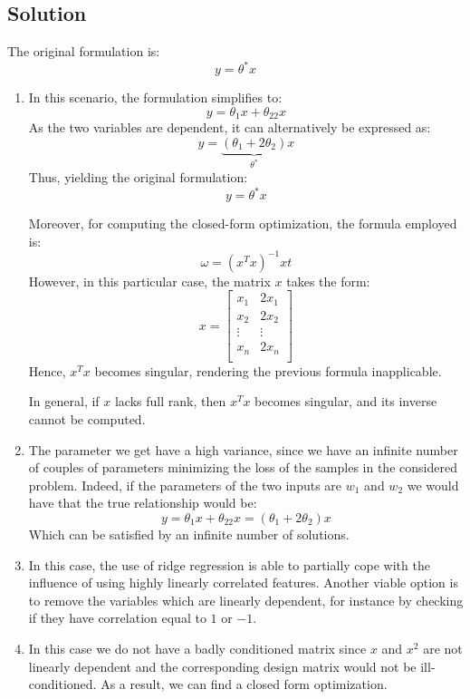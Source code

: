 \subsection{Solution}
The original formulation is: 
\[y=\theta^\ast x\]
\begin{enumerate}
    \item In this scenario, the formulation simplifies to:
        \[y=\theta_1x+\theta_22x\]
        As the two variables are dependent, it can alternatively be expressed as:
        \[y=\underbrace{\left(\theta_1+2\theta_2\right)}_{\theta^\ast} x\]
        Thus, yielding the original formulation:
        \[y=\theta^\ast x\]

        Moreover, for computing the closed-form optimization, the formula employed is:
        \[\omega=\left(x^Tx\right)^{-1}xt\]
        However, in this particular case, the matrix $x$ takes the form:
        \[x=\begin{bmatrix}
            x_1 & 2x_1 \\
            x_2 & 2x_2 \\
            \vdots & \vdots \\
            x_n & 2x_n \\
        \end{bmatrix}\]
        Hence, $x^Tx$ becomes singular, rendering the previous formula inapplicable.

        In general, if $x$ lacks full rank, then $x^Tx$ becomes singular, and its inverse cannot be computed.
    \item The parameter we get have a high variance, since we have an infinite number of couples of parameters minimizing the loss of the samples in the considered problem. 
        Indeed, if the parameters of the two inputs are $w_1$ and $w_2$ we would have that the true relationship would be:
        \[y=\theta_1x+\theta_22x=\left(\theta_1+2\theta_2\right)x\]
        Which can be satisfied by an infinite number of solutions.
    \item In this case, the use of ridge regression is able to partially cope with the influence of using highly linearly correlated features. 
        Another viable option is to remove the variables which are linearly dependent, for instance by checking if they have correlation equal to $1$ or $-1$. 
    \item In this case we do not have a badly conditioned matrix since $x$ and $x^2$ are not linearly dependent and the corresponding design matrix would not be ill-conditioned.
        As a result, we can find a closed form optimization. 
\end{enumerate}
